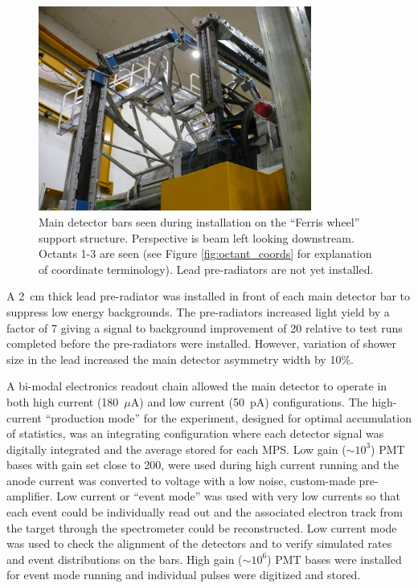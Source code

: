 \begin{figure}[ht]
\centering
\includegraphics[width=0.8\textwidth]{Pictures/md.JPG}
\caption{Main detector bars seen during installation on the ``Ferris wheel'' support structure. Perspective is beam left looking downstream. Octants 1-3 are seen (see Figure \ref{fig:octant_coords} for explanation of coordinate terminology). Lead pre-radiators are not yet installed.}
\label{fig:md_ferris}
\end{figure}

A 2~cm thick lead pre-radiator was installed in front of each main detector bar to suppress low energy backgrounds. The pre-radiators increased light yield by a factor of 7 giving a signal to background improvement of 20 relative to test runs completed before the pre-radiators were installed. However, variation of shower size in the lead increased the main detector asymmetry width by 10\%. 

A bi-modal electronics readout chain allowed the main detector to operate in both high current (180~$\mu$A) and low current (50~pA) configurations. The high-current ``production mode'' for the experiment, designed for optimal accumulation of statistics, was an integrating configuration where each detector signal was digitally integrated and the average stored for each MPS. Low gain ($\sim10^3$) PMT bases with gain set close to 200, were used during high current running and the anode current was converted to voltage with a low noise, custom-made pre-amplifier. Low current or ``event mode'' was used with very low currents so that each event could be individually read out and the associated electron track from the target through the spectrometer could be reconstructed. Low current mode was used to check the alignment of the detectors and to verify simulated rates and event distributions on the bars. High gain ($\sim10^6$) PMT bases were installed for event mode running and individual pulses were digitized and stored. 


